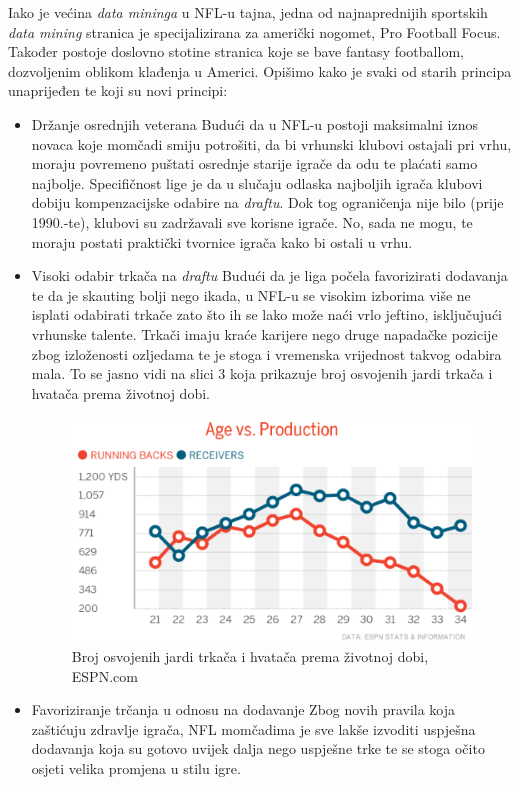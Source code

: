 \documentclass{ferseminar}
\begin{document}
Iako je većina \textit{data mininga} u NFL-u tajna, jedna od najnaprednijih sportskih \textit{data mining} stranica je specijalizirana za američki nogomet, Pro Football Focus. Također postoje doslovno stotine stranica koje se bave fantasy footballom, dozvoljenim oblikom klađenja u Americi.
\newline
Opišimo kako je svaki od starih principa unaprijeđen te koji su novi principi:
\begin{itemize}
	\item Držanje osrednjih veterana \cite{ringer_age}
	\newline
	Budući da u NFL-u postoji maksimalni iznos novaca koje momčadi smiju potrošiti, da bi vrhunski klubovi ostajali pri vrhu, moraju povremeno puštati osrednje starije igrače da odu te plaćati samo najbolje. Specifičnost lige je da u slučaju odlaska najboljih igrača klubovi dobiju kompenzacijske odabire na \textit{draftu}. Dok tog ograničenja nije bilo (prije 1990.-te), klubovi su zadržavali sve korisne igrače. No, sada ne mogu, te moraju postati praktički tvornice igrača kako bi ostali u vrhu.
	\item Visoki odabir trkača na \textit{draftu} \cite{RBs}
	\newline
	Budući da je liga počela favorizirati dodavanja te da je skauting bolji nego ikada, u NFL-u se visokim izborima više ne isplati odabirati trkače zato što ih se lako može naći vrlo jeftino, isključujući vrhunske talente. Trkači imaju kraće karijere nego druge napadačke pozicije zbog izloženosti ozljedama te je stoga i vremenska vrijednost takvog odabira mala. To se jasno vidi na slici 3 koja prikazuje broj osvojenih jardi trkača i hvatača prema životnoj dobi. \cite{RBs2}
	
	\begin{figure}[htb]
		\centering
		\includegraphics[]{img/rbs.png}
		\caption{Broj osvojenih jardi trkača i hvatača prema životnoj dobi, ESPN.com}
		\label{fig:shots}
	\end{figure}
	\newpage
	\item Favoriziranje trčanja u odnosu na dodavanje
	\newline
	Zbog novih pravila koja zaštićuju zdravlje igrača, NFL momčadima je sve lakše izvoditi uspješna dodavanja koja su gotovo uvijek dalja nego uspješne trke te se stoga očito osjeti velika promjena u stilu igre. \cite{RBs}
\end{itemize}
\end{document}
